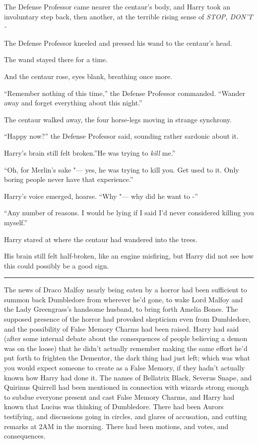 The Defense Professor came nearer the centaur's body, and Harry took an
involuntary step back, then another, at the terrible rising sense of
\emph{STOP, DON'T -}

The Defense Professor kneeled and pressed his wand to the centaur's
head.

The wand stayed there for a time.

And the centaur rose, eyes blank, breathing once more.

``Remember nothing of this time,'' the Defense Professor commanded.
``Wander away and forget everything about this night.''

The centaur walked away, the four horse-legs moving in strange
synchrony.

``Happy now?'' the Defense Professor said, sounding rather sardonic
about it.

Harry's brain still felt broken.''He was trying to \emph{kill} me.''

``Oh, for Merlin's sake "--- yes, he was trying to kill you. Get used to
it. Only boring people never have that experience.''

Harry's voice emerged, hoarse. ``Why "--- why did he want to -''

``Any number of reasons. I would be lying if I said I'd never considered
killing you myself.''

Harry stared at where the centaur had wandered into the trees.

His brain still felt half-broken, like an engine misfiring, but Harry
did not see how this could possibly be a good sign.

\begin{center}\rule{3in}{0.4pt}\end{center}

The news of Draco Malfoy nearly being eaten by a horror had been
sufficient to summon back Dumbledore from wherever he'd gone, to wake
Lord Malfoy and the Lady Greengrass's handsome husband, to bring forth
Amelia Bones. The supposed presence of the horror had provoked
skepticism even from Dumbledore, and the possibility of False Memory
Charms had been raised. Harry had said (after some internal debate about
the consequences of people believing a demon was on the loose) that he
didn't actually remember making the same effort he'd put forth to
frighten the Dementor, the dark thing had just left; which was what you
would expect someone to create as a False Memory, if they hadn't
actually known how Harry had done it. The names of Bellatrix Black,
Severus Snape, and Quirinus Quirrell had been mentioned in connection
with wizards strong enough to subdue everyone present and cast False
Memory Charms, and Harry had known that Lucius was thinking of
Dumbledore. There had been Aurors testifying, and discussions going in
circles, and glares of accusation, and cutting remarks at 2AM in the
morning. There had been motions, and votes, and consequences.

